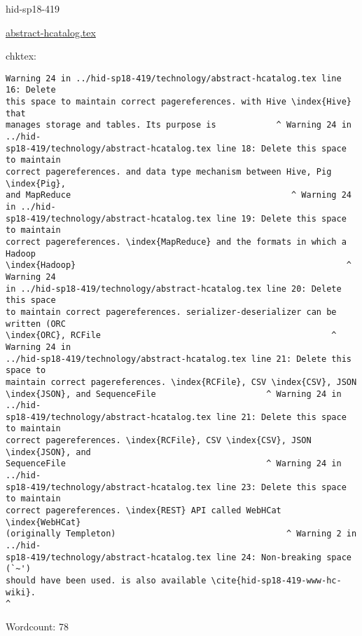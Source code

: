 \begin{IU}

hid-sp18-419

\href{https://github.com/cloudmesh-community/hid-sp18-419/blob/master//technology/abstract-hcatalog.tex}{abstract-hcatalog.tex}

 
chktex:
\begin{tiny}
\begin{verbatim}
Warning 24 in ../hid-sp18-419/technology/abstract-hcatalog.tex line 16: Delete
this space to maintain correct pagereferences. with Hive \index{Hive} that
manages storage and tables. Its purpose is            ^ Warning 24 in ../hid-
sp18-419/technology/abstract-hcatalog.tex line 18: Delete this space to maintain
correct pagereferences. and data type mechanism between Hive, Pig \index{Pig},
and MapReduce                                            ^ Warning 24 in ../hid-
sp18-419/technology/abstract-hcatalog.tex line 19: Delete this space to maintain
correct pagereferences. \index{MapReduce} and the formats in which a Hadoop
\index{Hadoop}                                                      ^ Warning 24
in ../hid-sp18-419/technology/abstract-hcatalog.tex line 20: Delete this space
to maintain correct pagereferences. serializer-deserializer can be written (ORC
\index{ORC}, RCFile                                              ^ Warning 24 in
../hid-sp18-419/technology/abstract-hcatalog.tex line 21: Delete this space to
maintain correct pagereferences. \index{RCFile}, CSV \index{CSV}, JSON
\index{JSON}, and SequenceFile                      ^ Warning 24 in ../hid-
sp18-419/technology/abstract-hcatalog.tex line 21: Delete this space to maintain
correct pagereferences. \index{RCFile}, CSV \index{CSV}, JSON \index{JSON}, and
SequenceFile                                        ^ Warning 24 in ../hid-
sp18-419/technology/abstract-hcatalog.tex line 23: Delete this space to maintain
correct pagereferences. \index{REST} API called WebHCat \index{WebHCat}
(originally Templeton)                                  ^ Warning 2 in ../hid-
sp18-419/technology/abstract-hcatalog.tex line 24: Non-breaking space (`~')
should have been used. is also available \cite{hid-sp18-419-www-hc-wiki}.
^
\end{verbatim}
\end{tiny}

Wordcount: 78

\end{IU}



